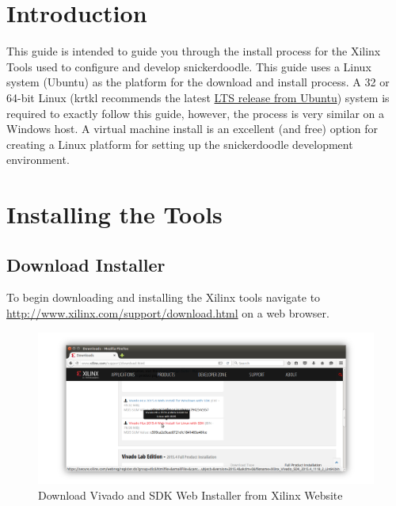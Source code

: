 \section{Introduction}

This guide is intended to guide you through the install process for the Xilinx Tools used to configure and develop snickerdoodle. This guide uses a Linux system (Ubuntu) as the platform for the download and install process. A 32 or 64-bit Linux (krtkl recommends the latest \href{http://www.ubuntu.com/download/desktop/}{LTS release from Ubuntu}) system is required to exactly follow this guide, however, the process is very similar on a Windows host. A virtual machine install is an excellent (and free) option for creating a Linux platform for setting up the snickerdoodle development environment. 


\section{Installing the Tools}

\subsection{Download Installer}



\noindent
To begin downloading and installing the Xilinx tools navigate to \url{http://www.xilinx.com/support/download.html} on a web browser. 

\begin{figure}
	\centering
	\includegraphics{images/Vivado_HLx_Download.png}
	\caption{Download Vivado and SDK Web Installer from Xilinx Website}
\end{figure}


